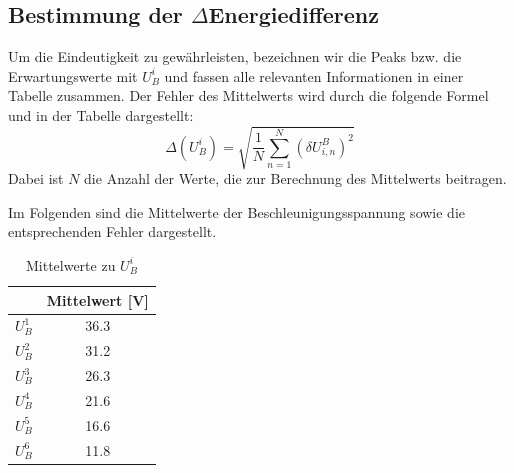 \documentclass{article}
\begin{document}
\begin{multicols}{2}
\subsection*{Bestimmung der $\Delta$Energiedifferenz}
Um die Eindeutigkeit zu gewährleisten, bezeichnen wir die Peaks bzw. die Erwartungswerte mit $U^i_B$ und 
fassen alle relevanten Informationen in einer Tabelle zusammen.
Der Fehler des Mittelwerts wird durch die folgende Formel und in der Tabelle dargestellt:
\begin{equation*}
\Delta(U^i_B) = \sqrt{\frac{1}{N} \sum_{n=1}^{N} \left( \delta U_{i,n}^B \right)^2}
\end{equation*}
Dabei ist \( N \) die Anzahl der Werte, die zur Berechnung des Mittelwerts beitragen.

Im Folgenden sind die Mittelwerte der Beschleunigungsspannung sowie die entsprechenden Fehler dargestellt.
\begin{table}[H]
  \centering
  \begin{tabular}{cc} 
      \hline
      & Mittelwert [V] \\ \hline
      $U^1_B$ & 36.3 \\ \hline
      $U^2_B$ & 31.2 \\ \hline
      $U^3_B$ & 26.3 \\ \hline
      $U^4_B$ & 21.6 \\ \hline
      $U^5_B$ & 16.6 \\ \hline
      $U^6_B$ & 11.8 \\ \hline
  \end{tabular}
  \caption{Mittelwerte zu $U^i_B$}
  \label{tab:median_values}
\end{table}


\end{multicols}
\end{document}
